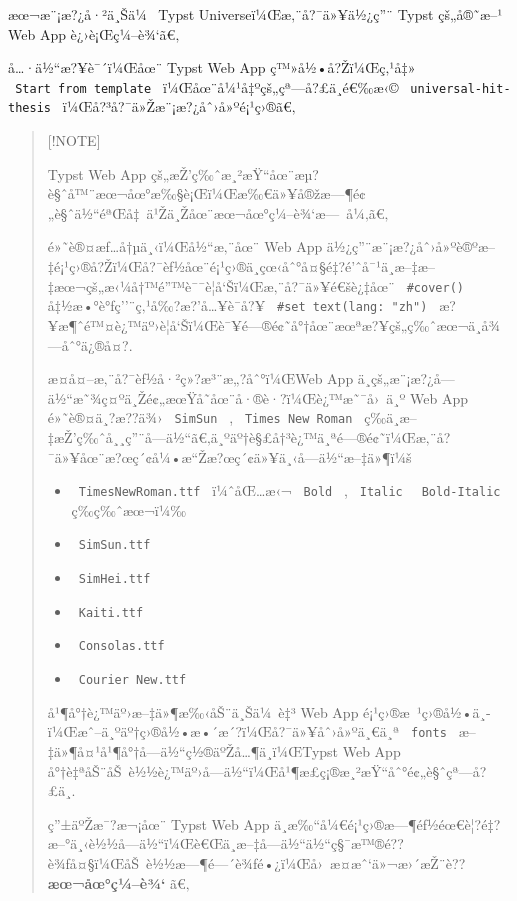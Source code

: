æœ¬æ¨¡æ?¿å·²ä¸Šä¼~ Typst Universeï¼Œæ‚¨å?¯ä»¥ä½¿ç''¨ Typst çš„å®˜æ--¹
Web App è¿›è¡Œç¼--è¾`ã€‚

å\ldots·ä½``æ?¥è¯´ï¼Œåœ¨ Typst Web App ç™»å½•å?Žï¼Œç‚¹å‡»
\texttt{\ Start\ from\ template\ } ï¼Œåœ¨å¼¹å‡ºçš„çª---å?£ä¸­é€‰æ‹©
\texttt{\ universal-hit-thesis\ } ï¼Œå?³å?¯ä»Žæ¨¡æ?¿åˆ›å»ºé¡¹ç›®ã€‚



\begin{quote}
{[}!NOTE{]}

Typst Web App
çš„æŽ'ç‰ˆæ¸²æŸ``åœ¨æµ?è§ˆå™¨æœ¬åœ°æ‰§è¡Œï¼Œæ‰€ä»¥å®žæ---¶é¢„è§ˆä½``éªŒå‡~ä¹Žä¸Žåœ¨æœ¬åœ°ç¼--è¾`æ---~å¼‚ã€‚

é»˜è®¤æƒ\ldots å†µä¸‹ï¼Œå½``æ‚¨åœ¨ Web App
ä½¿ç''¨æ¨¡æ?¿åˆ›å»ºè®ºæ--‡é¡¹ç›®å?Žï¼Œå?¯èƒ½åœ¨é¡¹ç›®ä¸­çœ‹åˆ°å¤§é‡?é'ˆå¯¹ä¸­æ--‡æ--‡æœ¬çš„æ‹¼å†™é''™è¯¯è­¦å`Šï¼Œæ‚¨å?¯ä»¥é€šè¿‡åœ¨
\texttt{\ \#cover()\ } å‡½æ•°è°ƒç''¨ç‚¹å‰?æ?'å\ldots¥è¯­å?¥
\texttt{\ \#set\ text(lang:\ "zh")\ }
æ?¥æ¶ˆé™¤è¿™äº›è­¦å`Šï¼Œè¯¥é---®é¢˜å°†åœ¨æœªæ?¥çš„ç‰ˆæœ¬ä¸­å¾---åˆ°ä¿®å¤?.

æ­¤å¤--æ‚¨å?¯èƒ½å·²ç»?æ³¨æ„?åˆ°ï¼ŒWeb App
ä¸­çš„æ¨¡æ?¿å­---ä½``æ˜¾ç¤ºä¸Žé¢„æœŸå­˜åœ¨å·®è·?ï¼Œè¿™æ˜¯å›~ä¸º Web App
é»˜è®¤ä¸?æ??ä¾› \texttt{\ SimSun\ } , \texttt{\ Times\ New\ Roman\ }
ç­‰ä¸­æ--‡æŽ'ç‰ˆå¸¸ç''¨å­---ä½``ã€‚ä¸ºäº†è§£å†³è¿™ä¸ªé---®é¢˜ï¼Œæ‚¨å?¯ä»¥åœ¨æ?œç´¢å¼•æ``Žæ?œç´¢ä»¥ä¸‹å­---ä½``æ--‡ä»¶ï¼š

\begin{itemize}
\tightlist
\item
  \texttt{\ TimesNewRoman.ttf\ } ï¼ˆåŒ\ldots æ‹¬ \texttt{\ Bold\ } ,
  \texttt{\ Italic\ } \texttt{\ Bold-Italic\ } ç­‰ç‰ˆæœ¬ï¼‰
\item
  \texttt{\ SimSun.ttf\ }
\item
  \texttt{\ SimHei.ttf\ }
\item
  \texttt{\ Kaiti.ttf\ }
\item
  \texttt{\ Consolas.ttf\ }
\item
  \texttt{\ Courier\ New.ttf\ }
\end{itemize}

å¹¶å°†è¿™äº›æ--‡ä»¶æ‰‹åŠ¨ä¸Šä¼~è‡³ Web App
é¡¹ç›®æ~¹ç›®å½•ä¸­ï¼Œæˆ--ä¸ºäº†ç›®å½•æ•´æ´?ï¼Œå?¯ä»¥åˆ›å»ºä¸€ä¸ª
\texttt{\ fonts\ } æ--‡ä»¶å¤¹å¹¶å°†å­---ä½``ç½®äºŽå\ldots¶ä¸­ï¼ŒTypst Web
App å°†è‡ªåŠ¨åŠ~è½½è¿™äº›å­---ä½``ï¼Œå¹¶æ­£ç¡®æ¸²æŸ``åˆ°é¢„è§ˆçª---å?£ä¸­.

ç''±äºŽæ¯?æ¬¡åœ¨ Typst Web App
ä¸­æ‰``å¼€é¡¹ç›®æ---¶éƒ½éœ€è¦?é‡?æ--°ä¸‹è½½å­---ä½``ï¼Œè€Œä¸­æ--‡å­---ä½``ä½``ç§¯æ™®é??è¾ƒå¤§ï¼ŒåŠ~è½½æ---¶é---´è¾ƒé•¿ï¼Œå›~æ­¤æˆ`ä»¬æ›´æŽ¨è??
\textbf{æœ¬åœ°ç¼--è¾`} ã€‚
\end{quote}


